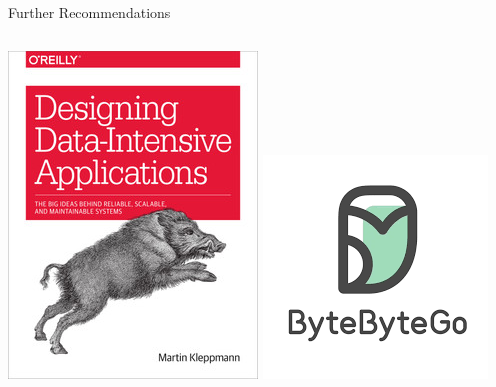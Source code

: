 \documentclass[12pt, aspectration=169]{beamer}
\begin{document}
\begin{frame}{Further Recommendations}
\begin{center}
\begin{columns}
                \includegraphics[scale=0.35]{static/images/designing_data_intensive_applications}
                \includegraphics[scale=0.6]{static/images/bytebytego}
            \end{columns}
        \end{center}
    \end{frame}
\end{document}
